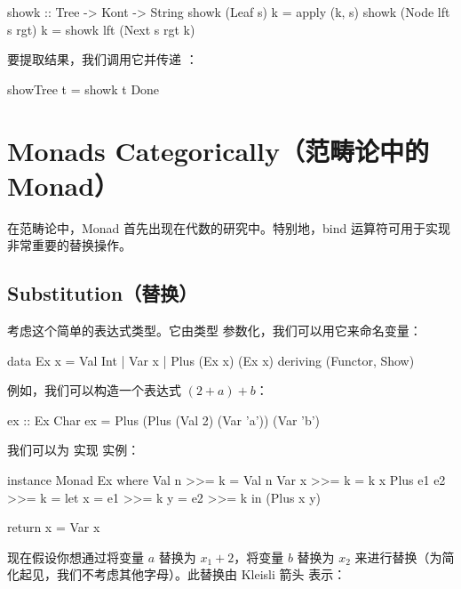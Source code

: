\documentclass[DaoFP]{subfiles}
\begin{document}
    \begin{haskell}
        showk :: Tree -> Kont -> String
        showk (Leaf s) k = apply (k, s)
        showk (Node lft s rgt) k = showk lft (Next s rgt k)
    \end{haskell}

    要提取结果，我们调用它并传递 ：

    \begin{haskell}
        showTree t = showk t Done
    \end{haskell}

    \section{Monads Categorically（范畴论中的Monad）}

    在范畴论中，Monad 首先出现在代数的研究中。特别地，bind 运算符可用于实现非常重要的替换操作。

    \subsection{Substitution（替换）}

    考虑这个简单的表达式类型。它由类型  参数化，我们可以用它来命名变量：

    \begin{haskell}
        data Ex x = Val Int
        | Var x
        | Plus (Ex x) (Ex x)
        deriving (Functor, Show)
    \end{haskell}

    例如，我们可以构造一个表达式 $(2 + a) + b$：

    \begin{haskell}
        ex :: Ex Char
        ex = Plus (Plus (Val 2) (Var 'a')) (Var 'b')
    \end{haskell}

    我们可以为  实现  实例：

    \begin{haskell}
        instance Monad Ex where
        Val n >>= k = Val n
        Var x >>= k = k x
        Plus e1 e2 >>= k =
        let x = e1 >>= k
        y = e2 >>= k
        in (Plus x y)

        return x = Var x
    \end{haskell}

    现在假设你想通过将变量 $a$ 替换为 $x_1 + 2$，将变量 $b$ 替换为 $x_2$ 来进行替换（为简化起见，我们不考虑其他字母）。此替换由 Kleisli 箭头  表示：
\end{document}
